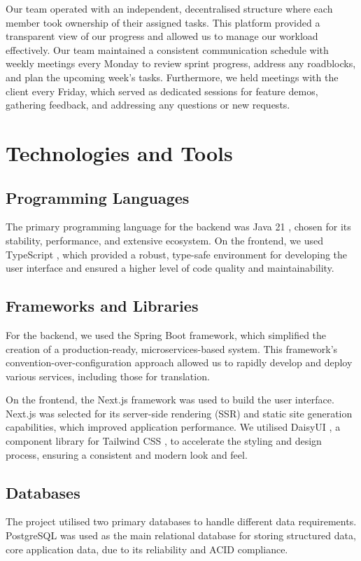 Our team operated with an independent, decentralised structure where each member took ownership of their assigned tasks. This platform provided a transparent view of our progress and allowed us to manage our workload effectively. Our team maintained a consistent communication schedule with weekly meetings every Monday to review sprint progress, address any roadblocks, and plan the upcoming week's tasks. Furthermore, we held meetings with the client every Friday, which served as dedicated sessions for feature demos, gathering feedback, and addressing any questions or new requests. 

    
\section{Technologies and Tools}
    \subsection{Programming Languages}
        The primary programming language for the backend was Java 21 \cite{oracle_java21}, chosen for its stability, performance, and extensive ecosystem. On the frontend, we used TypeScript \cite{typescript}, which provided a robust, type-safe environment for developing the user interface and ensured a higher level of code quality and maintainability.
    \subsection{Frameworks and Libraries}
        For the backend, we used the Spring Boot \cite{spring_boot} framework, which simplified the creation of a production-ready, microservices-based \cite{microservices_io} system. This framework's convention-over-configuration approach allowed us to rapidly develop and deploy various services, including those for translation.

        On the frontend, the Next.js \cite{nextjs} framework was used to build the user interface. Next.js was selected for its server-side rendering (SSR) \cite{epam_ssr} and static site generation capabilities, which improved application performance. We utilised DaisyUI \cite{daisyui}, a component library for Tailwind CSS \cite{tailwindcss}, to accelerate the styling and design process, ensuring a consistent and modern look and feel.
    \subsection{Databases}
        The project utilised two primary databases to handle different data requirements. PostgreSQL \cite{postgresql} was used as the main relational database for storing structured data, core application data, due to its reliability and ACID \cite{mongodb_acid} compliance. %
